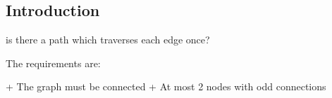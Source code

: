 
\subsection{Introduction}

is there a path which traverses each edge once?

The requirements are:

+ The graph must be connected
+ At most 2 nodes with odd connections

